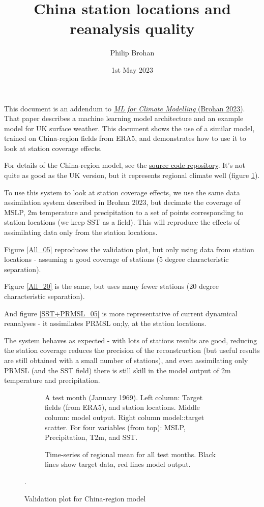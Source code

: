 \documentclass[a4paper,12pt]{article}
\title{China station locations and reanalysis quality}
\author{Philip Brohan}
\date{1st May 2023}
\begin{document}
 
\maketitle

This document is an addendum to \href{https://metoffice.sharepoint.com/:b:/r/sites/csspchinaext/MO%20Outputs%20Upload/WP1/Papers/D1.6.3_Brohan_ML_for_climate_modelling.pdf?csf=1&web=1&e=G4ypno}{{\it ML for Climate Modelling} (Brohan 2023)}. That paper describes a machine learning model architecture and an example model for UK surface weather. This document shows the use of a similar model, trained on China-region fields from ERA5, and demonstrates how to use it to look at station coverage effects.

For details of the China-region model, see the \href{https://github.com/philip-brohan/ML_monthly_China}{source code repository}. It's not quite as good as the UK version, but it represents regional climate well (figure \ref{Validation}).

To use this system to look at station coverage effects, we use the same data assimilation system described in Brohan 2023, but decimate the coverage of MSLP, 2m temperature and precipitation to a set of points corresponding to station locations (we keep SST as a field). This will reproduce the effects of assimilating data only from the station locations.

Figure \ref{All_05} reproduces the validation plot, but only using data from station locations - assuming a good coverage of stations (5 degree characteristic separation).

Figure \ref{All_20} is the same, but uses many fewer stations (20 degree characteristic separation).

And figure \ref{SST+PRMSL_05} is more representative of current dynamical reanalyses - it assimilates PRMSL on;ly, at the station locations.

The system behaves as expected - with lots of stations results are good, reducing the station coverage reduces the precision of the reconstruction (but useful results are still obtained with a small number of stations), and even assimilating only PRMSL (and the SST field) there is still skill in the model output of 2m temperature and precipitation.

\begin{figure}[h]
\begin{subfigure}{1.0\textwidth}    
\caption{A test month (January 1969). Left column: Target fields (from ERA5), and station locations. Middle column: model output. Right column model::target scatter. For four variables (from top): MSLP, Precipitation, T2m, and SST.}
\end{subfigure}
\begin{subfigure}{1.0\textwidth}    
\caption{Time-series of regional mean for all test months. Black lines show target data, red lines model output.}
\end{subfigure}
\caption{Validation plot for China-region model}.
\label{Validation}
\end{figure}
     
\end{document}
